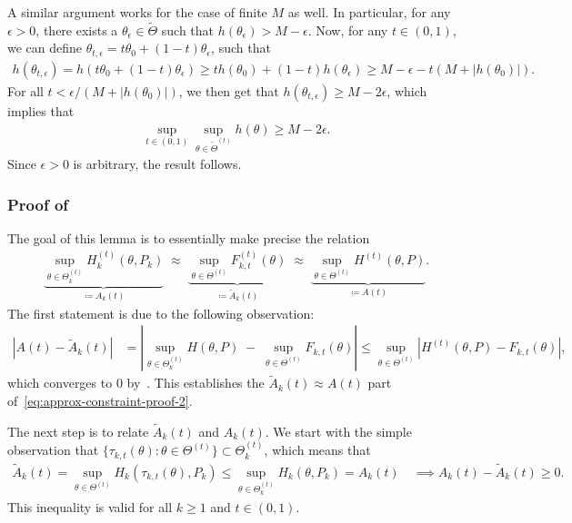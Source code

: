 \documentclass{article}
\theoremstyle{plain}
\theoremstyle{definition}
\begin{document}
 A similar argument works for the case of finite $M$ as well. In particular, for any $\epsilon > 0$, there exists a $\theta_\epsilon \in \widetilde{\Theta}$ such that $h(\theta_\epsilon) > M - \epsilon$. Now, for any $t \in (0, 1)$, we can define $\theta_{t,\epsilon} = t \theta_0 + (1-t) \theta_\epsilon$, such that 
 \begin{align}
     h(\theta_{t,\epsilon}) = h(t \theta_0 + (1-t) \theta_\epsilon) \geq t h(\theta_0) + (1-t) h(\theta_\epsilon) \geq M - \epsilon - t (M + |h(\theta_0)|). 
 \end{align}
For all $t < \epsilon/(M + |h(\theta_0)|)$, we then get that $h(\theta_{t,\epsilon}) \geq M - 2\epsilon$, which implies that 
\begin{align}
    \sup_{t\in (0,1)} \sup_{\theta \in \widetilde{\Theta}^{(t)}} h(\theta) \geq M - 2\epsilon. 
\end{align}
Since $\epsilon >0$ is arbitrary, the result follows. 

\subsubsection{Proof of~}
\label{proof:approx-constraint-interchange-2}
The goal of this lemma is to essentially make precise the  relation 
\begin{align}
  \underbrace{\sup_{\theta \in \Theta_k^{(t)} } H_k^{(t)}(\theta, P_k) }_{\coloneqq A_k(t)} \; \approx \;
  \underbrace{\sup_{\theta \in \Theta^{(t)} } F_{k,t}^{(t)}(\theta) }_{\coloneqq \widetilde{A}_k(t)} \; \approx \;
  \underbrace{\sup_{\theta \in \Theta^{(t)} } H^{(t)}(\theta, P) }_{\coloneqq A(t)}. \label{eq:approx-constraint-proof-2}
\end{align}
The first statement is due to the following observation:
\begin{align}
    |A(t) - \widetilde{A}_k(t)| & = \left\rvert \sup_{\theta \in \Theta_k^{(t)}} H(\theta, P) \; - \; \sup_{\theta \in \Theta^{(t)}} F_{k,t}(\theta)  \right\rvert 
     \leq \sup_{\theta \in \Theta^{(t)}} \left \lvert H^{(t)}(\theta, P) - F_{k,t}(\theta) \right\rvert,\label{eq:approx-constraint-proof-6}
\end{align}
which converges to $0$ by~. This establishes the $\widetilde{A}_k(t) \approx A(t)$ part of~\eqref{eq:approx-constraint-proof-2}.

The next step is to relate $\widetilde{A}_k(t)$ and $A_k(t)$. We start with the simple observation that $\{\tau_{k,t}(\theta): \theta \in \Theta^{(t)}\} \subset \Theta^{(t)}_k$, which means that 
\begin{align}
    \widetilde{A}_k(t) = \sup_{\theta \in \Theta^{(t)}} H_k(\tau_{k,t}(\theta), P_k) \leq  \sup_{\theta \in \Theta_k^{(t)}} H_k(\theta, P_k)  = A_k(t) \quad \implies A_k(t) - \widetilde{A}_k(t) \geq 0.  \label{eq:approx-constraint-proof-3}
\end{align}
This inequality is valid for all $k \geq 1$ and $t \in (0,1)$. 
\end{document}

